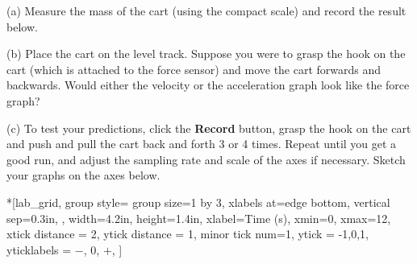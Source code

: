 (a) Measure the mass of the cart (using the compact scale) and record the result below.

\answerspace{10mm}

(b) Place the cart on the level track.  Suppose you were to grasp the hook on the cart (which is attached to the force sensor) and move the cart forwards and backwards. Would either the
velocity or the acceleration graph look like the force graph?



\answerspace{20mm}
\pagebreak[3]
(c) To test your predictions, click the \textbf{Record} button, grasp the
hook on the cart and push and pull the cart back and forth 3 or 4 times. Repeat until you get a good run, and adjust the sampling rate and scale of the axes if necessary. Sketch your graphs on the axes below.


\begin{lab_groupplot}*{}[lab_grid,
	group style={
		group size=1 by 3,
		xlabels at=edge bottom,
		vertical sep=0.3in,
		},
	width=4.2in,  height=1.4in,
	xlabel=Time (s),
	xmin=0, xmax=12,
	xtick distance = 2, 
	ytick distance = 1, 
	minor tick num=1,
	ytick = {-1,0,1},
	yticklabels = {$-$, 0, $+$},
	]
\nextgroupplot[
	ymin=-1,ymax=1, 
	ylabel={Velocity (m/s)},
	]
\nextgroupplot[
	ymin=-1,ymax=1, 
	ylabel={Acceleration (m/s$^2$)},
	]
\nextgroupplot[
	ymin=-1,ymax=1, 
	ylabel={Force (N)},
	]
\end{lab_groupplot}

